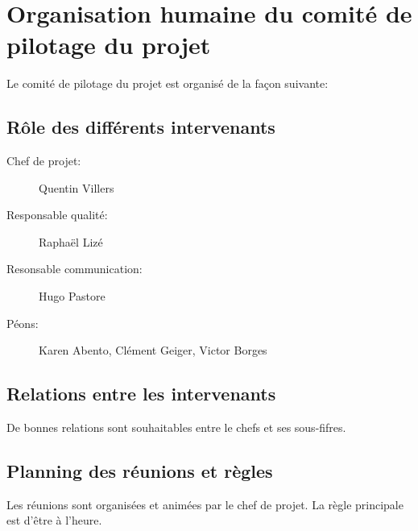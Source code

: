 
\section{Organisation humaine du comité de pilotage du projet}

Le comité de pilotage du projet est organisé de la façon suivante:

    \subsection{Rôle des différents intervenants}
\begin{description}
\item[Chef de projet:] Quentin Villers
\item[Responsable qualité:] Raphaël Lizé
\item[Resonsable communication:] Hugo Pastore
\item[Péons:] Karen Abento, Clément Geiger, Victor Borges
\end{description}

    \subsection{Relations entre les intervenants}
De bonnes relations sont souhaitables entre le chefs et ses sous-fifres.
    \subsection{Planning des réunions et règles}
Les réunions sont organisées et animées par le chef de projet.
La règle principale est d'être à l'heure.
\vfill
\pagebreak
